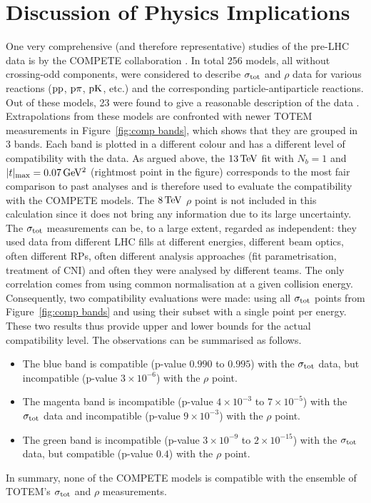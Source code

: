 \section{Discussion of Physics Implications}
\label{sec:discussion}

One very comprehensive (and therefore representative) studies of the pre-LHC data is by the COMPETE collaboration \cite{compete}. In total 256 models, all without crossing-odd components, were considered to describe $\sigma_{\rm tot}$ and $\rho$ data for various reactions ($\rm pp$, $\rm p\pi$, $\rm pK$, etc.) and the corresponding particle-antiparticle reactions. Out of these models, 23 were found to give a reasonable description of the data \cite{compete-details}. Extrapolations from these models are confronted with newer TOTEM measurements in Figure~\ref{fig:comp bands}, which shows that they are grouped in 3 bands. Each band is plotted in a different colour and has a different level of compatibility with the data. As argued above, the $13\,{\rm TeV}$ fit with $N_b=1$ and $|t|_{\rm max} = 0.07\,{\rm GeV^2}$ (rightmost point in the figure) corresponds to the most fair comparison to past analyses and is therefore used to evaluate the compatibility with the COMPETE models. The $8\,{\rm TeV}$ $\rho$ point is not included in this calculation since it does not bring any information due to its large uncertainty. The $\sigma_{\rm tot}$ measurements can be, to a large extent, regarded as independent: they used data from different LHC fills at different energies, different beam optics, often different RPs, often different analysis approaches (fit parametrisation, treatment of CNI) and often they were analysed by different teams. The only correlation comes from using common normalisation at a given collision energy. Consequently, two compatibility evaluations were made: using all $\sigma_{\rm tot}$ points from Figure~\ref{fig:comp bands} and using their subset with a single point per energy. These two results thus provide upper and lower bounds for the actual compatibility level. The observations can be summarised as follows.
\begin{itemize}[noitemsep,topsep=0pt]
\item The blue band is compatible (p-value $0.990$ to $0.995$) with the $\sigma_{\rm tot}$ data, but incompatible (p-value $3\times10^{-6}$) with the $\rho$ point.
\item The magenta band is incompatible (p-value $4\times10^{-3}$ to $7\times10^{-5}$) with the $\sigma_{\rm tot}$ data and incompatible (p-value $9\times10^{-3}$) with the $\rho$ point.
\item The green band is incompatible (p-value $3\times10^{-9}$ to $2\times10^{-15}$) with the $\sigma_{\rm tot}$ data, but compatible (p-value $0.4$) with the $\rho$ point.
\end{itemize}
In summary, none of the COMPETE models is compatible with the ensemble of TOTEM's $\sigma_{\rm tot}$ and $\rho$ measurements.

